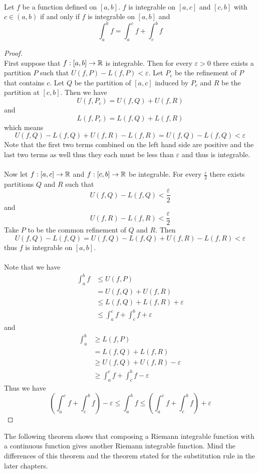 \documentclass[a4paper]{article}
\begin{document}
\begin{thm}{}{}\\ Let $f$ be a function defined on $[a,b]$. $f$ is integrable on $[a,c]$ and $[c,b]$ with $c\in(a,b)$ if and only if $f$ is integrable on $[a,b]$ and $$\int_{a}^{b}f=\int_{a}^{c}f+\int_{c}^{b}f$$ 
\begin{proof}\\ First suppose that $f:[a,b]\to\mathbb{R}$ is integrable. Then for every $\varepsilon>0$ there exists a partition $P$ such that $U(f,P)-L(f,P)<\varepsilon$. Let $P_c$ be the refinement of $P$ that contains $c$. Let $Q$ be the partition of $[a,c]$ induced by $P_c$ and $R$ be the partition at $[c,b]$. Then we have $$U(f,P_c)=U(f,Q)+U(f,R)$$ and $$L(f,P_c)=L(f,Q)+L(f,R)$$ which means $$U(f,Q)-L(f,Q)+U(f,R)-L(f,R)=U(f,Q)-L(f,Q)<\varepsilon$$ Note that the first two terms combined on the left hand side are positive and the last two terms as well thus they each must be less than $\varepsilon$ and thus is integrable. \\~\\
Now let $f:[a,c]\to\mathbb{R}$ and $f:[c,b]\to\mathbb{R}$ be integrable. For every $\frac{\varepsilon}{2}$ there exists partitions $Q$ and $R$ such that $$U(f,Q)-L(f,Q)<\frac{\varepsilon}{2}$$ and $$U(f,R)-L(f,R)<\frac{\varepsilon}{2}$$ Take $P$ to be the common refinement of $Q$ and $R$. Then $$U(f,Q)-L(f,Q)=U(f,Q)-L(f,Q)+U(f,R)-L(f,R)<\varepsilon$$ thus $f$ is integrable on $[a,b]$. \\~\\
Note that we have 
\begin{align*}
\int_a^bf&\leq U(f,P)\\
&=U(f,Q)+U(f,R)\\
&\leq L(f,Q)+L(f,R)+\varepsilon\\
&\leq\int_a^cf+\int_c^bf+\varepsilon
\end{align*} and
\begin{align*}
\int_a^b&\geq L(f,P)\\
&=L(f,Q)+L(f,R)\\
&\geq U(f,Q)+U(f,R)-\varepsilon\\
&\geq\int_a^cf+\int_c^bf-\varepsilon
\end{align*}
Thus we have $$\left(\int_a^cf+\int_c^bf\right)-\varepsilon\leq\int_a^bf\leq\left(\int_a^cf+\int_c^bf\right)+\varepsilon$$
\end{proof}
\end{thm}

The following theorem shows that composing a Riemann integrable function with a continuous function gives another Riemann integrable function. Mind the differences of this theorem and the theorem stated for the substitution rule in the later chapters. 
\end{document}
